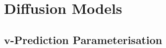 \documentclass[ oneside,%
                    author={George Herbert},
                    degree={MSci},
                     title={Diffusion Models for Time-Evolving Precipitation Fields},
                  subtitle={}]{dissertation}
\begin{document}
%
%
%

\backmatter





\appendix

\chapter{Diffusion Models}
\label{appx:diffusion}

\section{$\mathbf{v}$-Prediction Parameterisation}
\label{appx:diffusion_v_prediction_parameterisation}
\end{document}
